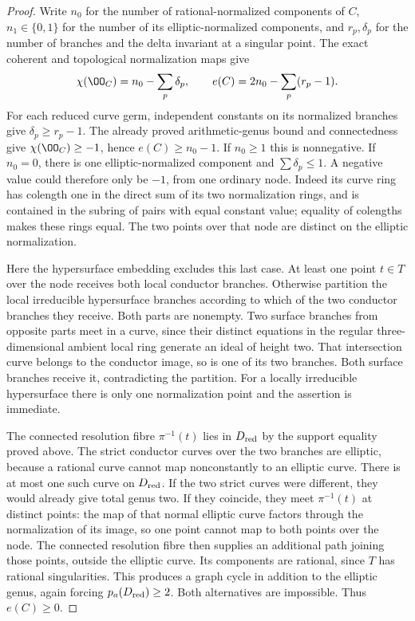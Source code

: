 \begin{proof}
Write $n_0$ for the number of rational-normalized components
of $C$, $n_1\in\{0,1\}$ for the number of its
elliptic-normalized components, and $r_p,\delta_p$ for the
number of branches and the delta invariant at a singular
point. The exact coherent and topological normalization maps
give
\[
 \chi(\OO_C)=n_0-\sum_p\delta_p,
 \qquad e(C)=2n_0-\sum_p(r_p-1).
\]
For each reduced curve germ, independent constants on its
normalized branches give $\delta_p\ge r_p-1$.
The already proved arithmetic-genus bound and connectedness
give $\chi(\OO_C)\ge-1$, hence $e(C)\ge n_0-1$.
If $n_0\ge1$ this is nonnegative. If $n_0=0$, there is
one elliptic-normalized component and
$\sum\delta_p\le1$. A negative value could therefore only
be $-1$, from one ordinary node. Indeed its curve ring has
colength one in the direct sum of its two normalization
rings, and is contained in the subring of pairs with equal
constant value; equality of colengths makes these rings
equal. The two points over that node are distinct on the
elliptic normalization.

Here the hypersurface embedding excludes this last case.
At least one point $t\in T$ over the node receives both
local conductor branches. Otherwise partition the local
irreducible hypersurface branches according to which of
the two conductor branches they receive. Both parts are
nonempty. Two surface branches from opposite parts meet
in a curve, since their distinct equations in the regular
three-dimensional ambient local ring generate an ideal
of height two. That intersection curve belongs to the
conductor image, so is one of its two branches. Both
surface branches receive it, contradicting the partition.
For a locally irreducible hypersurface there is only one
normalization point and the assertion is immediate.

The connected resolution fibre $\pi^{-1}(t)$ lies in
$D_{\rm red}$ by the support equality proved above.
The strict conductor curves over the two branches are
elliptic, because a rational curve cannot map
nonconstantly to an elliptic curve. There is at most one
such curve on $D_{\rm red}$. If the two strict curves
were different, they would already give total genus two.
If they coincide, they meet $\pi^{-1}(t)$ at distinct
points: the map of that normal elliptic curve factors
through the normalization of its image, so one point
cannot map to both points over the node. The connected
resolution fibre then supplies an additional path joining
those points, outside the elliptic curve. Its components
are rational, since $T$ has rational singularities.
This produces a graph cycle in addition to the elliptic
genus, again forcing $p_a(D_{\rm red})\ge2$.
Both alternatives are impossible. Thus $e(C)\ge0$.
\end{proof}

